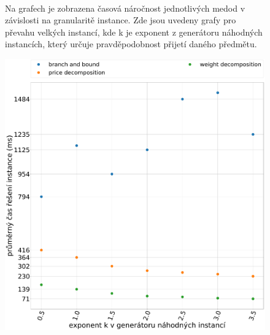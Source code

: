 \documentclass[11pt]{article}
\begin{document}
\begin{figure}
\begin{minipage}[c]{0.49\textwidth}
    \end{minipage}
    \\
   \caption{Na grafech je zobrazena časová náročnost jednotlivých medod v závislosti na granularitě instance. Zde jsou uvedeny grafy pro převahu velkých instancí, kde k je exponent z generátoru náhodných instancích, který určuje pravděpodobnost přijetí daného předmětu.}\label{fig:GVI}
   
    \end{figure} 
    
    \begin{figure}
	\centering
    \begin{minipage}[c]{0.49\textwidth}
        \centering\includegraphics[width=\textwidth]{img/GME.pdf} 
    \end{minipage}
    \begin{minipage}[c]{0.49\textwidth}

\end{minipage}
\end{figure}
\end{document}

